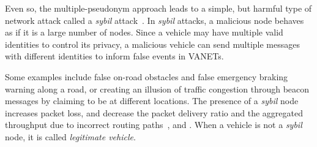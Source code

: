 \documentclass[preprint,12pt]{elsarticle}
\begin{document}
Even so, the multiple-pseudonym approach leads to a simple, but harmful type of network attack called a \textit{sybil} attack~\cite{sybil}. In \textit{sybil} attacks, a malicious node behaves as if it is a large number of nodes. Since a vehicle may have multiple valid identities to control its privacy, a malicious vehicle can send multiple messages with different identities to inform false events in VANETs.

Some examples include false on-road obstacles and false emergency braking warning along a road, or creating an illusion of traffic congestion through beacon messages by claiming to be at different locations. The presence of a \textit{sybil} node increases packet loss, and decrease the packet delivery ratio and the aggregated throughput due to incorrect routing paths~\cite{sybil-impact3}, \cite{sybil-impact2} and \cite{sybil-attack-impact-routing1}. When a vehicle is not a \textit{sybil} node, it is called \textit{legitimate vehicle}.

%


\end{document}
